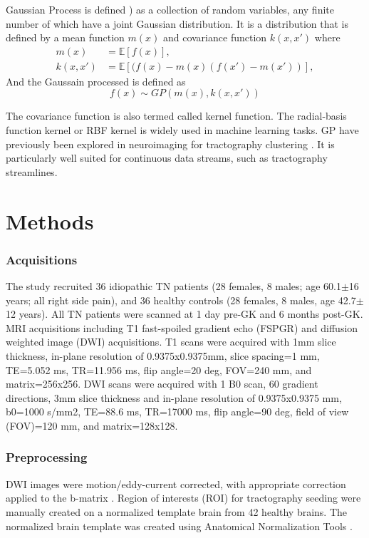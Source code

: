 Gaussian Process is defined \cite{rasmussen2006gaussian}) as a collection of random variables, any finite number of which have a joint Gaussian distribution. 
It is a distribution that is defined by a mean function $m(x)$ and covariance function $k(x,x') $ where
\begin{equation}
	\begin{split}
		m(x) &= \mathbb{E}[f(x)], \\
		k(x,x') &= \mathbb{E}[(f(x)-m(x)(f(x')-m(x'))],
	\end{split}
\end{equation}
And the Gaussain processed is defined as
\begin{equation}
f(x) \sim GP(m(x), k(x, x')) 
\end{equation}

The covariance function is also termed called kernel function. The radial-basis function kernel or RBF kernel is widely used in machine learning tasks. GP have previously been explored in neuroimaging for tractography clustering \cite{Wassermann2010}. It is particularly well suited for continuous data streams, such as tractography streamlines. 

\section{Methods}
\subsubsection{Acquisitions}
The study recruited 36 idiopathic TN patients (28 females, 8 males; age 60.1$\pm$16 years; all right side pain), and 36 healthy controls (28 females, 8 males, age 42.7$\pm$12 years).  All TN patients were scanned at 1 day pre-GK and 6 months post-GK. MRI acquisitions including T1 fast-spoiled gradient echo (FSPGR) and diffusion weighted image (DWI) acquisitions. T1 scans were acquired with 1mm slice thickness, in-plane resolution of 0.9375x0.9375mm, slice spacing=1 mm, TE=5.052 ms, TR=11.956 ms, flip angle=20 deg, FOV=240 mm, and matrix=256x256. DWI scans were acquired with 1 B0 scan, 60 gradient directions, 3mm slice thickness and in-plane resolution of 0.9375x0.9375 mm, b0=1000 s/mm2, TE=88.6 ms, TR=17000 ms, flip angle=90 deg, field of view (FOV)=120 mm, and matrix=128x128.

\subsubsection{Preprocessing}
DWI images were motion/eddy-current corrected, with appropriate correction applied to the b-matrix \cite{Leemans2009}. Region of interests (ROI) for tractography seeding were manually created on a normalized template brain from 42 healthy brains. The normalized brain template was created using Anatomical Normalization Tools \cite{Avants2010,Avants2011}. 

